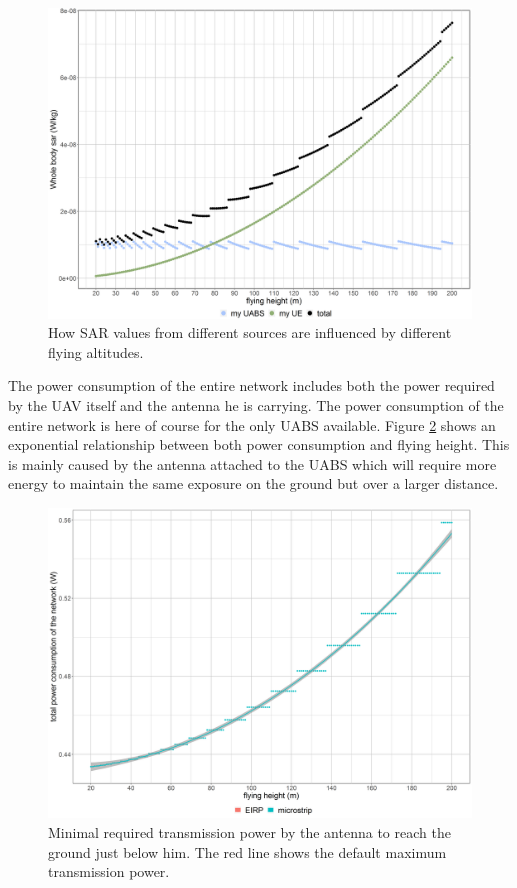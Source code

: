 \begin{figure}[]
  \includegraphics[width=\textwidth]{../results/s1/fhvssar.png}
  \caption{How SAR values from different sources are influenced by different flying altitudes.}
  \label{fig:s1_fhsar}
\end{figure}

The power consumption of the entire network includes both the power required by the \gls{UAV} itself and the antenna he is carrying.
The power consumption of the entire network is here of course for the only \gls{UABS} available. Figure \ref{fig:fhvspc} shows an 
exponential relationship between both power consumption and flying height. This  is mainly caused by the antenna 
attached to the \gls{UABS} which will require more energy to maintain the same exposure on the ground but over a larger distance.

\begin{figure}[t]
  \centering
  \includegraphics[width=\textwidth]{../results/s1/fhvspc.png}
  \caption{Minimal required transmission power by the antenna to reach the ground just below him. The red line shows the default maximum transmission power.}
  \label{fig:fhvspc}
\end{figure}

